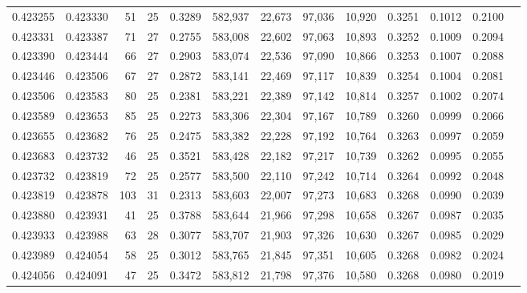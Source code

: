 \begin{tabular}{rrrrrrrrrrrrr}
0.423255 & 0.423330 &    51 &  25 &                                     0.3289 & 582,937 &  22,673 &  97,036 &  10,920 & 0.3251 & 0.1012 & 0.2100 \\
0.423331 & 0.423387 &    71 &  27 &                                     0.2755 & 583,008 &  22,602 &  97,063 &  10,893 & 0.3252 & 0.1009 & 0.2094 \\
0.423390 & 0.423444 &    66 &  27 &                                     0.2903 & 583,074 &  22,536 &  97,090 &  10,866 & 0.3253 & 0.1007 & 0.2088 \\
0.423446 & 0.423506 &    67 &  27 &                                     0.2872 & 583,141 &  22,469 &  97,117 &  10,839 & 0.3254 & 0.1004 & 0.2081 \\
0.423506 & 0.423583 &    80 &  25 &                                     0.2381 & 583,221 &  22,389 &  97,142 &  10,814 & 0.3257 & 0.1002 & 0.2074 \\
0.423589 & 0.423653 &    85 &  25 &                                     0.2273 & 583,306 &  22,304 &  97,167 &  10,789 & 0.3260 & 0.0999 & 0.2066 \\
0.423655 & 0.423682 &    76 &  25 &                                     0.2475 & 583,382 &  22,228 &  97,192 &  10,764 & 0.3263 & 0.0997 & 0.2059 \\
0.423683 & 0.423732 &    46 &  25 &                                     0.3521 & 583,428 &  22,182 &  97,217 &  10,739 & 0.3262 & 0.0995 & 0.2055 \\
0.423732 & 0.423819 &    72 &  25 &                                     0.2577 & 583,500 &  22,110 &  97,242 &  10,714 & 0.3264 & 0.0992 & 0.2048 \\
0.423819 & 0.423878 &   103 &  31 &                                     0.2313 & 583,603 &  22,007 &  97,273 &  10,683 & 0.3268 & 0.0990 & 0.2039 \\
0.423880 & 0.423931 &    41 &  25 &                                     0.3788 & 583,644 &  21,966 &  97,298 &  10,658 & 0.3267 & 0.0987 & 0.2035 \\
0.423933 & 0.423988 &    63 &  28 &                                     0.3077 & 583,707 &  21,903 &  97,326 &  10,630 & 0.3267 & 0.0985 & 0.2029 \\
0.423989 & 0.424054 &    58 &  25 &                                     0.3012 & 583,765 &  21,845 &  97,351 &  10,605 & 0.3268 & 0.0982 & 0.2024 \\
0.424056 & 0.424091 &    47 &  25 &                                     0.3472 & 583,812 &  21,798 &  97,376 &  10,580 & 0.3268 & 0.0980 & 0.2019 \\

\end{tabular}
